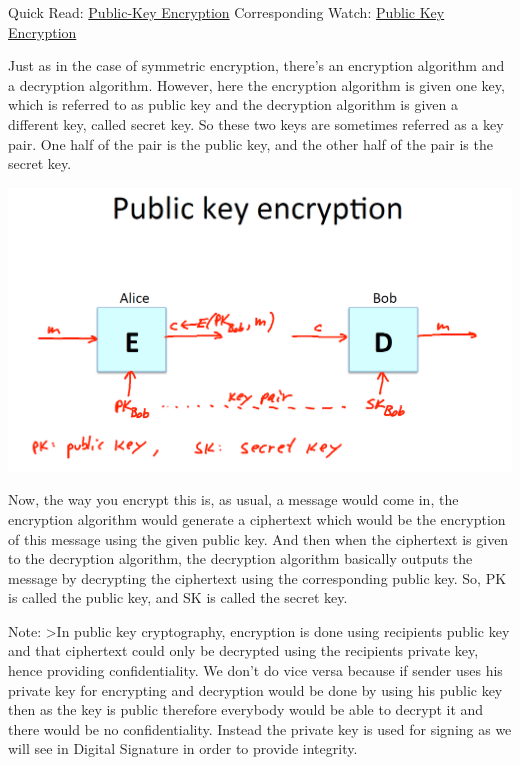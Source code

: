 \documentclass[11pt]{article}
\makeatletter
\def\maxwidth{\ifdim\Gin@nat@width>\linewidth\linewidth
    \else\Gin@nat@width\fi}
\let\Oldincludegraphics\includegraphics
\renewcommand{\includegraphics}[1]{\Oldincludegraphics[width=.8\maxwidth]{#1}}
\makeatother
\begin{document}
Quick Read:
\href{https://www.tutorialspoint.com/cryptography/public_key_encryption.htm}{Public-Key
Encryption} Corresponding Watch:
\href{https://www.coursera.org/learn/crypto/lecture/HB4jI/public-key-encryption}{Public
Key Encryption}

Just as in the case of symmetric encryption, there's an encryption
algorithm and a decryption algorithm. However, here the encryption
algorithm is given one key, which is referred to as public key and the
decryption algorithm is given a different key, called secret key. So
these two keys are sometimes referred as a key pair. One half of the
pair is the public key, and the other half of the pair is the secret
key.

\includegraphics{./Images/PKEnc-InPic.png}

Now, the way you encrypt this is, as usual, a message would come in, the
encryption algorithm would generate a ciphertext which would be the
encryption of this message using the given public key. And then when the
ciphertext is given to the decryption algorithm, the decryption
algorithm basically outputs the message by decrypting the ciphertext
using the corresponding public key. So, PK is called the public key, and
SK is called the secret key.

Note: \textgreater{}In public key cryptography, encryption is done using
recipients public key and that ciphertext could only be decrypted using
the recipients private key, hence providing confidentiality. We don't do
vice versa because if sender uses his private key for encrypting and
decryption would be done by using his public key then as the key is
public therefore everybody would be able to decrypt it and there would
be no confidentiality. Instead the private key is used for signing as we
will see in Digital Signature in order to provide integrity.
\end{document}
